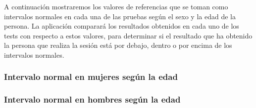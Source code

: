 A continuación mostraremos los valores de referencias que se toman como intervalos normales en cada una de las pruebas según el sexo y la edad de la persona. La aplicación comparará los resultados obtenidos en cada uno de los tests con respecto a estos valores, para determinar si el resultado que ha obtenido la persona que realiza la sesión está por debajo, dentro o por encima de los intervalos normales.

\subsubsection{Intervalo normal en mujeres según la edad}


\subsubsection{Intervalo normal en hombres según la edad}


